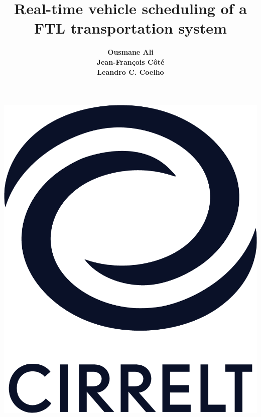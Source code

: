 \documentclass[9pt,xcolor={dvipsnames}]{beamer}
\begin{document}
\begin{center}
\vspace*{0.1cm}
 \includegraphics[scale=0.15]{cirrelt.png}\\[\bigskipamount]
\end{center}

\vspace*{-2.2cm}
\title[Concrete transport optimization]{Real-time vehicle scheduling of a FTL transportation system}
\author[Ousmane Ali]{\textbf{Ousmane Ali\\ Jean-Fran\c{c}ois C\^ot{\'e} \\ Leandro C. Coelho}}

\date{}

\vspace{-0.5cm}
\end{document}
